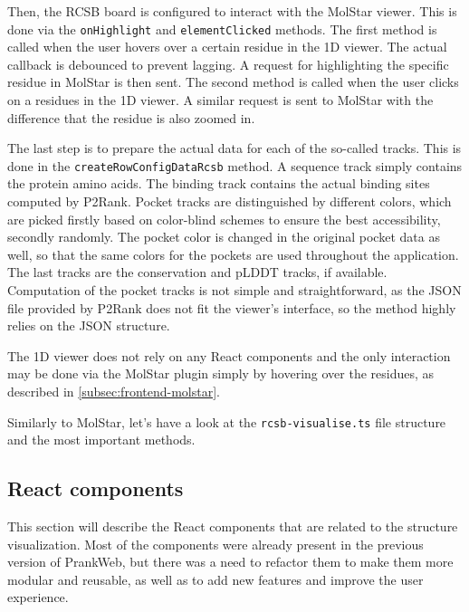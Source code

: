 Then, the RCSB board is configured to interact with the MolStar viewer. This is done via the \texttt{onHighlight} and \texttt{elementClicked} methods. The first method is called when the user hovers over a certain residue in the 1D viewer. The actual callback is debounced to prevent lagging. A request for highlighting the specific residue in MolStar is then sent. The second method is called when the user clicks on a residues in the 1D viewer. A similar request is sent to MolStar with the difference that the residue is also zoomed in.

The last step is to prepare the actual data for each of the so-called tracks. This is done in the \texttt{createRowConfigDataRcsb} method. A sequence track simply contains the protein amino acids. The binding track contains the actual binding sites computed by P2Rank. Pocket tracks are distinguished by different colors, which are picked firstly based on color-blind schemes to ensure the best accessibility, secondly randomly. The pocket color is changed in the original pocket data as well, so that the same colors for the pockets are used throughout the application. The last tracks are the conservation and pLDDT tracks, if available. Computation of the pocket tracks is not simple and straightforward, as the JSON file provided by P2Rank does not fit the viewer's interface, so the method highly relies on the JSON structure.

The 1D viewer does not rely on any React components and the only interaction may be done via the MolStar plugin simply by hovering over the residues, as described in \cref{subsec:frontend-molstar}.

Similarly to MolStar, let's have a look at the \texttt{rcsb-visualise.ts} file structure and the most important methods.




\subsection{React components}
\label{subsec:frontend-react}

This section will describe the React components that are related to the structure visualization. Most of the components were already present in the previous version of PrankWeb, but there was a need to refactor them to make them more modular and reusable, as well as to add new features and improve the user experience.

